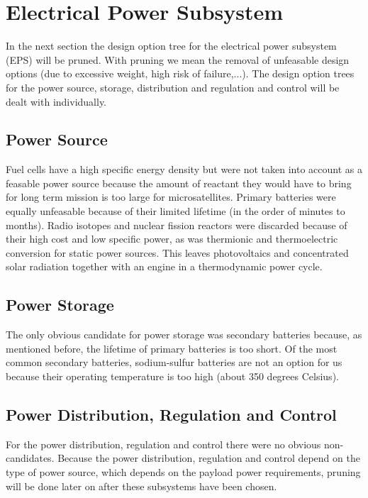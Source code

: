 \section{Electrical Power Subsystem}

In the next section the design option tree for the electrical power subsystem (EPS) will be pruned. With pruning we mean the removal of unfeasable design options (due to excessive weight, high risk of failure,...). The design option trees for the power source, storage, distribution and regulation and control will be dealt with individually.

\subsection{Power Source}

Fuel cells have a high specific energy density but were not taken into account as a feasable power source because the amount of reactant they would have to bring for long term mission is too large for microsatellites. Primary batteries were equally unfeasable because of their limited lifetime (in the order of minutes to months). Radio isotopes and nuclear fission reactors were discarded because of their high cost and low specific power, as was thermionic and thermoelectric conversion for static power sources.
This leaves photovoltaics and concentrated solar radiation together with an engine in a thermodynamic power cycle.

\subsection{Power Storage}

The only obvious candidate for power storage was secondary batteries because, as mentioned before, the lifetime of primary batteries is too short.
Of the most common secondary batteries, sodium-sulfur batteries are not an option for us because their operating temperature is too high (about 350 degrees Celsius).

\subsection{Power Distribution, Regulation and Control}

For the power distribution, regulation and control there were no obvious non-candidates. Because the power distribution, regulation and control depend on the type of power source, which depends on the payload power requirements, pruning will be done later on after these subsystems have been chosen.
